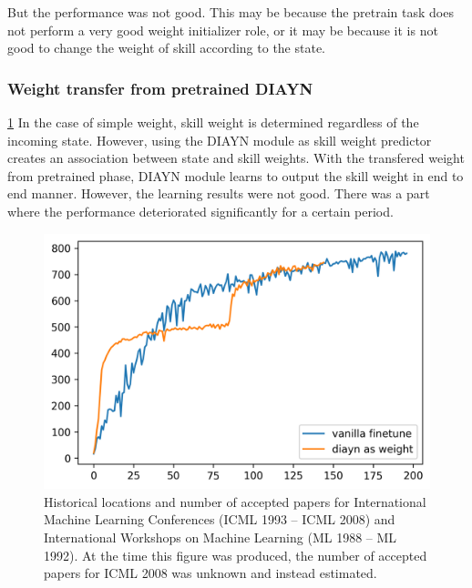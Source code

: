  But the performance was not good. This may be because the pretrain task does not perform a very good weight initializer role,
 or it may be because it is not good to change the weight of skill according to the state.

\subsubsection{Weight transfer from pretrained DIAYN}

\cref*{diayn-as-skill-weight}
In the case of simple weight, skill weight is determined regardless of the incoming state.
However, using the DIAYN module as skill weight predictor creates an association between state and skill weights.
With the transfered weight from pretrained phase, DIAYN module learns to output the skill weight in end to end manner.
However, the learning results were not good.
There was a part where the performance deteriorated significantly for a certain period.

\begin{figure}[ht]
  \vskip 0.2in
  \begin{center}
  \centerline{\includegraphics[width=\columnwidth]{Figures/diayn_as_skill_on_walker_run.png}}
  \caption{Historical locations and number of accepted papers for International
  Machine Learning Conferences (ICML 1993 -- ICML 2008) and International
  Workshops on Machine Learning (ML 1988 -- ML 1992). At the time this figure was
  produced, the number of accepted papers for ICML 2008 was unknown and instead
  estimated.}
  \label{diayn-as-skill-weight}
  \end{center}
  \vskip -0.2in
  \end{figure}

